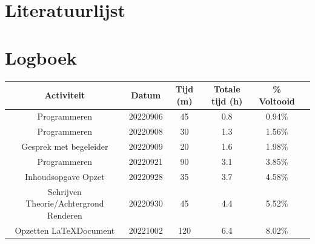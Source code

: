 \documentclass[12pt, a4paper]{article}
\begin{document}
\section{Literatuurlijst}


\clearpage
\section{Logboek}
\begin{adjustbox}{angle=270}
\begin{tabular}{ | c | c c c c c | }
\hline
Activiteit & Datum & Tijd (m) & Totale tijd (h) &       \% Voltooid \\
\hline
Programmeren & 20220906 & 45 & 0.8 & 0.94\% \\
Programmeren & 20220908 & 30 & 1.3 & 1.56\% \\
Gesprek met begeleider & 20220909 & 20 & 1.6 & 1.98\% \\
Programmeren & 20220921 & 90 & 3.1 & 3.85\% \\
Inhoudsopgave Opzet & 20220928 & 35 & 3.7 & 4.58\% \\
Schrijven Theorie/Achtergrond Renderen & 20220930 & 45 & 4.4 & 5.52\% \\
Opzetten \LaTeX \space Document & 20221002 & 120 & 6.4 & 8.02\% \\
\hline
\end{tabular}
\end{adjustbox}
\end{document}
